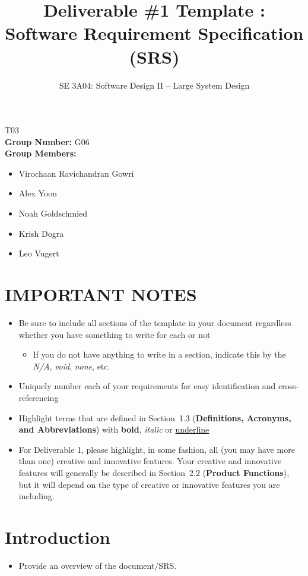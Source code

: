 \documentclass[]{article}
\title{Deliverable \#1 Template : Software Requirement Specification (SRS)}
\author{SE 3A04: Software Design II -- Large System Design}
\date{}
\begin{document}
\maketitle
{} T03\\
{\bf Group Number:} G06 \\
{\bf Group Members:}
\begin{itemize}
	\item Virochaan Ravichandran Gowri
	\item Alex Yoon
	\item Noah Goldschmied
	\item Krish Dogra
	\item Leo Vugert
\end{itemize}

\section*{IMPORTANT NOTES}
\begin{itemize}
	\item Be sure to include all sections of the template in your document regardless whether you have something to write for each or not
	      \begin{itemize}
		      \item If you do not have anything to write in a section, indicate this by the \emph{N/A}, \emph{void}, \emph{none}, etc.
	      \end{itemize}
	\item Uniquely number each of your requirements for easy identification and cross-referencing
	\item Highlight terms that are defined in Section~1.3 (\textbf{Definitions, Acronyms, and Abbreviations}) with \textbf{bold}, \emph{italic} or \underline{underline}
	\item For Deliverable 1, please highlight, in some fashion, all (you may have more than one) creative and innovative features. Your creative and innovative features will generally be described in Section~2.2 (\textbf{Product Functions}), but it will depend on the type of creative or innovative features you are including.
\end{itemize}

\newpage
\section{Introduction}
\label{sec:introduction}

\begin{itemize}
	\item Provide an overview of the document/SRS.
\end{itemize}
\end{document}
